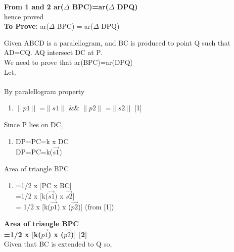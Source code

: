 \documentclass[journal,12pt,twocolumn]{IEEEtran}
\begin{document}
\textbf{From 1 and 2 ar($\Delta$ BPC)=ar($\Delta$ DPQ)}\\
hence proved\\
\justify
\textbf{To Prove:}
ar($\Delta$ BPC) = ar($\Delta$ DPQ)
\begin{flushleft}
Given ABCD is a paralellogram, and BC is produced to point Q such that AD=CQ. AQ intersect DC at P.\\
We need to prove that ar(BPC)=ar(DPQ)\\
Let,\hfill \\
\\
\justify
\vspace{0.1cm}
By paralellogram property\\
\begin{enumerate}
\item[]
$\lVert{p1}\rVert$ =$\lVert{s1}\rVert$ \&\& $\lVert{p2}\rVert$ =$\lVert{s2}\rVert $ \hspace{1.2cm}[1]\\
\end{enumerate}
\vspace{3cm}
Since P lies on DC,\\
\begin{enumerate}
\item[]
DP=PC=k x DC\\
DP=PC=k($\vec{s1}$)\\
\end{enumerate}
Area of triangle BPC \\
\begin{enumerate}
\item[]
=1/2 x [PC x BC] \\
=1/2 x [k($\vec{s1}$) x $\vec{s2}$] \\
= 1/2 x [k($\vec{p1}$) x ($\vec{p2}$)] (from [1])\\ 
\end{enumerate}
\textbf{Area of triangle BPC}\\
\vspace{0.1cm}
\textbf{=1/2 x [k($\vec{p1}$) x ($\vec{p2}$)]  \hspace{2.5cm}[2]}\\
\vspace{0.1cm}
Given that BC is extended to Q so,\\ 
\begin{enumerate}

\end{enumerate}
\end{flushleft}
\end{document}
